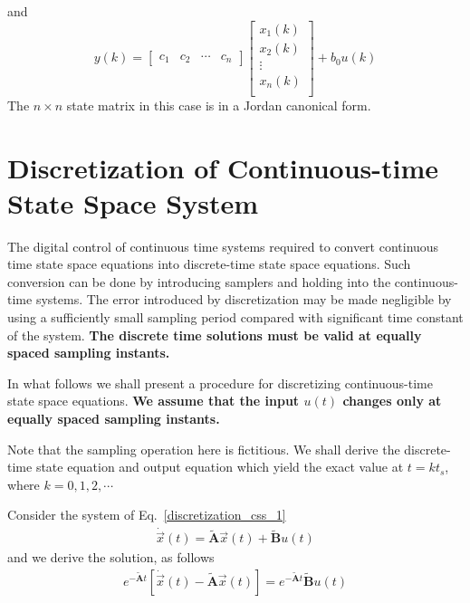 \documentclass[11pt,a4paper,oneside]{book}
\numberwithin{equation}{section}
\theoremstyle{it}
\theoremstyle{definition}
\begin{document}
and 
\begin{equation}\label{pfepm_eq_21}
	y(k) =
	\left[\begin{array}{cccc}
		c_1 & c_2 & \cdots & c_n 
	\end{array}\right]
	\left[\begin{array}{c}
		x_1(k) \\[6pt]
		x_2(k) \\[6pt]
		\vdots \\[6pt]
		x_n(k) \\[6pt] 
	\end{array}\right] + b_0 u(k)
\end{equation}
The $n \times n$ state matrix in this case is in a Jordan canonical form.

\section{Discretization of Continuous-time State Space System} 
The digital control of continuous time systems required to convert continuous 
time state space equations into discrete-time state space equations. Such 
conversion can be done by introducing samplers and holding into the 
continuous-time systems. The error introduced by discretization may be made 
negligible by using a sufficiently small sampling period compared with 
significant time constant of the system. \textbf{The discrete time solutions 
must be valid at equally spaced sampling instants.}

In what follows we shall present a procedure for discretizing continuous-time 
state space equations. \textbf{We assume that the input ${{u}(t)}$ changes only 
at equally spaced sampling instants.} 

Note that the sampling operation here is fictitious. We shall derive the 
discrete-time state equation and output equation which yield the exact value at 
$t = kt_s$, where $k=0,1,2,\cdots$

Consider the system of Eq.~\eqref{discretization_css_1}
\begin{equation}\label{discretization_css_1}
	\begin{aligned}
		\dot{\vec{x}}(t) = \tilde{\mathbf{A}} \vec{x}(t) + \tilde{\mathbf{B}}u(t)
	\end{aligned}
\end{equation}
and we derive the solution, as follows
\begin{equation}\label{discretization_css_2}
	\begin{aligned}
		e^{-\tilde{\mathbf{A}}t}\left[  \dot{\vec{x}}(t) - \tilde{\mathbf{A}} \vec{x}(t) \right] = e^{-\tilde{\mathbf{A}}t} \tilde{\mathbf{B}}u(t)
	\end{aligned}
\end{equation}
\end{document}

